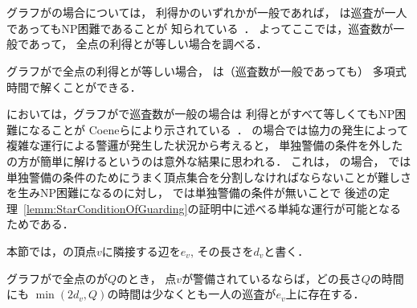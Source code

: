 \section{{\graphStar}}
\label{section: star}

グラフが{\graphStar}の場合については，
利得か{\maxIdletime}のいずれかが一般であれば，
{\patProb}は巡査が一人であってもNP困難であることが
知られている~\cite[Theorem~5 and 6]{coene2011charlemagne}．
よってここでは，巡査数が一般であって，
全点の利得と{\maxIdletime}が等しい場合を調べる．

\begin{theo}
  \label{theo:StarUnaryProfitAndIdletime}
  グラフが{\graphStar}で全点の利得と{\maxIdletime}が等しい場合，
  {\patProb}は（巡査数が一般であっても）
  多項式時間で解くことができる．
\end{theo}

{\independentPatProb}においては，グラフが{\graphStar}で巡査数が一般の場合は
利得と{\maxIdletime}がすべて等しくてもNP困難になることが
Coeneらにより示されている~\cite[Theorem~10]{coene2011charlemagne}．
{\graphLine}の場合では協力の発生によって複雑な運行による警邏が発生した状況から考えると，
単独警備の条件を外した{\patProb}の方が簡単に解けるというのは意外な結果に思われる．
これは，
{\graphStar}の場合，
{\independentPatProb}では
単独警備の条件のためにうまく頂点集合を分割しなければならないことが難しさを生みNP困難になるのに対し，
{\patProb}では単独警備の条件が無いことで
後述の定理~\ref{lemm:StarConditionOfGuarding}の証明中に述べる単純な運行が可能となるためである．

本節では，{\graphStar}の頂点$v$に隣接する辺を$e_v$, その長さを$d_v$と書く．

\begin{lemm}
  \label{lemm:StarCostOfVertex}
  グラフが{\graphStar}で全点の{\maxIdletime}が$Q$のとき，
  点$v$が警備されているならば，どの長さ$Q$の時間にも
  $\min(2d_v, Q)$の時間は少なくとも一人の巡査が$e_v$上に存在する．
\end{lemm}

